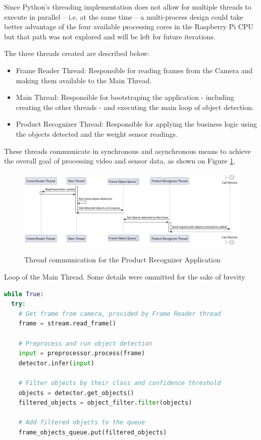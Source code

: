 Since Python's threading implementation does not allow for multiple threads to
execute in parallel -- i.e. at the same time -- a multi-process design could take
better advantage of the four available processing cores in the Raspberry Pi CPU
but that path was not explored and will be left for future iterations.

The three threads created are described below:
\begin{itemize}
    \item Frame Reader Thread: Responsible for reading frames from the Camera and making them available to the Main Thread.
    \item Main Thread: Responsible for bootstraping the application - including creating the other threads - and executing the main loop of
        object detection.
    \item Product Recognizer Thread: Responsible for applying the business logic using the objects detected and the weight sensor readings.
\end{itemize}

These threads communicate in synchronous and asynchronous means to achieve the overall goal of processing video and sensor data, as shown on Figure \ref{fig:threads}.

\begin{figure}[H]
	\centering
	\caption[Thread communication for the Product Recognizer Appplication]{Thread communication for the Product Recognizer Application}
    \includegraphics[width=1\textwidth]{./images/Product Recognizer Thread communication.png}
	\fonte{}
	\label{fig:threads}
\end{figure}

\begin{sourcecode}
\caption{Loop of the Main Thread. Some details were ommitted for the sake of brevity}
\begin{lstlisting}[language=Python,label={lst:main}]
while True:
  try:
    # Get frame from camera, provided by Frame Reader thread
    frame = stream.read_frame()

    # Preprocess and run object detection
    input = preprocessor.process(frame)
    detector.infer(input)

    # Filter objects by their class and confidence threshold
    objects = detector.get_objects()
    filtered_objects = object_filter.filter(objects)

    # Add filtered objects to the queue
    frame_objects_queue.put(filtered_objects)
\end{lstlisting}
\fonte{}
\end{sourcecode}

